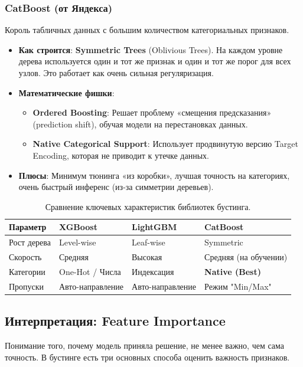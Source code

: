 \documentclass[12pt]{article}
\begin{document}
\subsubsection{CatBoost (от Яндекса)}
Король табличных данных с большим количеством категориальных признаков.
\begin{itemize}
    \item \textbf{Как строится}: \textbf{Symmetric Trees} (Oblivious Trees). На каждом уровне дерева используется один и тот же признак и один и тот же порог для всех узлов. Это работает как очень сильная регуляризация.
    \item \textbf{Математические фишки}: 
    \begin{itemize}
        \item \textbf{Ordered Boosting}: Решает проблему «смещения предсказания» (prediction shift), обучая модели на перестановках данных.
        \item \textbf{Native Categorical Support}: Использует продвинутую версию Target Encoding, которая не приводит к утечке данных.
    \end{itemize}
    \item \textbf{Плюсы}: Минимум тюнинга «из коробки», лучшая точность на категориях, очень быстрый инференс (из-за симметрии деревьев).
\end{itemize}

\begin{table}[h]
    \centering
    \small
    \begin{tabular}{@{}llll@{}}
        \toprule
        \textbf{Параметр} & \textbf{XGBoost} & \textbf{LightGBM} & \textbf{CatBoost} \\
        \midrule
        Рост дерева & Level-wise & Leaf-wise & Symmetric \\
        Скорость & Средняя & Высокая & Средняя (на обучении) \\
        Категории & One-Hot / Числа & Индексация & \textbf{Native (Best)} \\
        Пропуски & Авто-направление & Авто-направление & Режим "Min/Max" \\
        \bottomrule
    \end{tabular}
    \caption{Сравнение ключевых характеристик библиотек бустинга.}
\end{table}

\subsection{Интерпретация: Feature Importance}
Понимание того, почему модель приняла решение, не менее важно, чем сама точность. В бустинге есть три основных способа оценить важность признаков.
\end{document}
